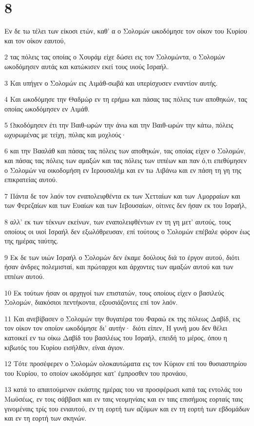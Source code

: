 \chapter{8}

\par Εν δε τω τέλει των είκοσι ετών, καθ' α ο Σολομών ωκοδόμησε τον οίκον του Κυρίου και τον οίκον εαυτού,
\par 2 τας πόλεις τας οποίας ο Χουράμ είχε δώσει εις τον Σολομώντα, ο Σολομών ωκοδόμησεν αυτάς και κατώκισεν εκεί τους υιούς Ισραήλ.
\par 3 Και υπήγεν ο Σολομών εις Αιμάθ-σωβά και υπερίσχυσεν εναντίον αυτής.
\par 4 Και ωκοδόμησε την Θαδμώρ εν τη ερήμω και πάσας τας πόλεις των αποθηκών, τας οποίας ωκοδόμησεν εν Αιμάθ.
\par 5 Ωικοδόμησεν έτι την Βαιθ-ωρών την άνω και την Βαιθ-ωρών την κάτω, πόλεις ωχυρωμένας με τείχη, πύλας και μοχλούς·
\par 6 και την Βααλάθ και πάσας τας πόλεις των αποθηκών, τας οποίας είχεν ο Σολομών, και πάσας τας πόλεις των αμαξών και τας πόλεις των ιππέων και παν ό,τι επεθύμησεν ο Σολομών να οικοδομήση εν Ιερουσαλήμ και εν τω Λιβάνω και εν πάση τη γη της επικρατείας αυτού.
\par 7 Πάντα δε τον λαόν τον εναπολειφθέντα εκ των Χετταίων και των Αμορραίων και των Φερεζαίων και των Ευαίων και των Ιεβουσαίων, οίτινες δεν ήσαν εκ του Ισραήλ,
\par 8 αλλ' εκ των τέκνων εκείνων, των εναπολειφθέντων εν τη γη μετ' αυτούς, τους οποίους οι υιοί Ισραήλ δεν εξωλόθρευσαν, επί τούτους ο Σολομών επέβαλε φόρον έως της ημέρας ταύτης.
\par 9 Εκ δε των υιών Ισραήλ ο Σολομών δεν έκαμε δούλους διά το έργον αυτού, διότι ήσαν άνδρες πολεμισταί, και πρώταρχοι και άρχοντες των αμαξών αυτού και των ιππέων αυτού.
\par 10 Εκ τούτων ήσαν οι αρχηγοί των επιστατών, τους οποίους είχεν ο βασιλεύς Σολομών, διακόσιοι πεντήκοντα, εξουσιάζοντες επί τον λαόν.
\par 11 Και ανεβίβασεν ο Σολομών την θυγατέρα του Φαραώ εκ της πόλεως Δαβίδ, εις τον οίκον τον οποίον ωκοδόμησε δι' αυτήν· διότι είπεν, Η γυνή μου δεν θέλει κατοικεί εν τω οίκω Δαβίδ του βασιλέως του Ισραήλ, επειδή το μέρος, όπου η κιβωτός του Κυρίου εισήλθεν, είναι άγιον.
\par 12 Τότε προσέφερεν ο Σολομών ολοκαυτώματα εις τον Κύριον επί του θυσιαστηρίου του Κυρίου, το οποίον ωκοδόμησε κατ' έμπροσθεν του προνάου,
\par 13 κατά το απαιτούμενον εκάστης ημέρας του να προσφέρωσι κατά τας εντολάς του Μωϋσέως, εν τοις σάββασι και εν ταις νεομηνίαις και εν ταις επισήμοις εορταίς ταις γινομέναις τρίς του ενιαυτού, εν τη εορτή των αζύμων και εν τη εορτή των εβδομάδων και εν τη εορτή των σκηνών.
